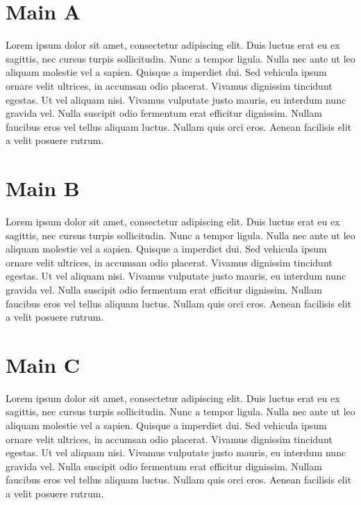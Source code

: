 \section{Main A}

Lorem ipsum dolor sit amet, consectetur adipiscing elit. Duis luctus erat eu ex
sagittis, nec cursus turpis sollicitudin. Nunc a tempor ligula. Nulla nec ante ut leo aliquam molestie vel a sapien. Quisque a imperdiet dui. Sed vehicula ipsum ornare velit ultrices, in accumsan odio placerat. Vivamus dignissim tincidunt egestas. Ut vel aliquam nisi. Vivamus vulputate justo mauris, eu interdum nunc gravida vel. Nulla suscipit odio fermentum erat efficitur dignissim. Nullam faucibus eros vel tellus aliquam luctus. Nullam quis orci eros. Aenean facilisis elit a velit posuere rutrum. 

\section{Main B}
Lorem ipsum dolor sit amet, consectetur adipiscing elit. Duis luctus erat eu ex sagittis, nec cursus turpis sollicitudin. Nunc a tempor ligula. Nulla nec ante ut leo aliquam molestie vel a sapien. Quisque a imperdiet dui. Sed vehicula ipsum ornare velit ultrices, in accumsan odio placerat. Vivamus dignissim tincidunt egestas. Ut vel aliquam nisi. Vivamus vulputate justo mauris, eu interdum nunc gravida vel. Nulla suscipit odio fermentum erat efficitur dignissim. Nullam faucibus eros vel tellus aliquam luctus. Nullam quis orci eros. Aenean facilisis elit a velit posuere rutrum. 

\section{Main C}

Lorem ipsum dolor sit amet, consectetur adipiscing elit. Duis luctus erat eu ex sagittis, nec cursus turpis sollicitudin. Nunc a tempor ligula. Nulla nec ante ut leo aliquam molestie vel a sapien. Quisque a imperdiet dui. Sed vehicula ipsum ornare velit ultrices, in accumsan odio placerat. Vivamus dignissim tincidunt egestas. Ut vel aliquam nisi. Vivamus vulputate justo mauris, eu interdum nunc gravida vel. Nulla suscipit odio fermentum erat efficitur dignissim. Nullam faucibus eros vel tellus aliquam luctus. Nullam quis orci eros. Aenean facilisis elit a velit posuere rutrum. 